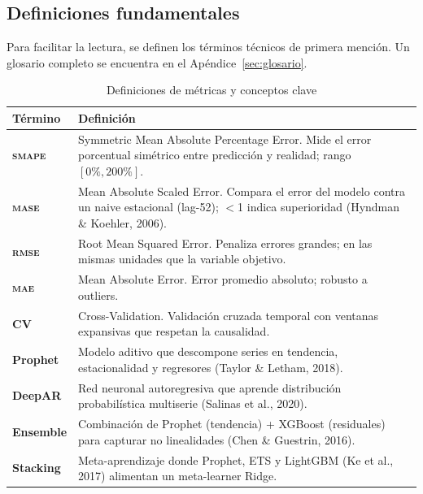 \documentclass[12pt, letterpaper]{article}
\newcommand{\smape}{\textnormal{\textsc{smape}}}
\newcommand{\mase}{\textnormal{\textsc{mase}}}
\newcommand{\rmse}{\textnormal{\textsc{rmse}}}
\newcommand{\mae}{\textnormal{\textsc{mae}}}
\begin{document}
\newpage

\subsection{Definiciones fundamentales}

Para facilitar la lectura, se definen los términos técnicos de primera mención. Un glosario completo se encuentra en el Apéndice~\ref{sec:glosario}.

\begin{table}[H]
\centering
\caption{Definiciones de métricas y conceptos clave}
\label{tab:definiciones}
\small
\begin{tabularx}{\textwidth}{>{\bfseries}l X}
\toprule
\textbf{Término} & \textbf{Definición} \\
\midrule
\smape{} & Symmetric Mean Absolute Percentage Error. Mide el error porcentual simétrico entre predicción y realidad; rango $[0\%, 200\%]$. \\
\mase{} & Mean Absolute Scaled Error. Compara el error del modelo contra un naive estacional (lag-52); $<$1 indica superioridad (Hyndman \& Koehler, 2006). \\
\rmse{} & Root Mean Squared Error. Penaliza errores grandes; en las mismas unidades que la variable objetivo. \\
\mae{} & Mean Absolute Error. Error promedio absoluto; robusto a outliers. \\
CV & Cross-Validation. Validación cruzada temporal con ventanas expansivas que respetan la causalidad. \\
Prophet & Modelo aditivo que descompone series en tendencia, estacionalidad y regresores (Taylor \& Letham, 2018). \\
DeepAR & Red neuronal autoregresiva que aprende distribución probabilística multiserie (Salinas et al., 2020). \\
Ensemble & Combinación de Prophet (tendencia) + XGBoost (residuales) para capturar no linealidades (Chen \& Guestrin, 2016). \\
Stacking & Meta-aprendizaje donde Prophet, ETS y LightGBM (Ke et al., 2017) alimentan un meta-learner Ridge. \\
\bottomrule
\end{tabularx}
\end{table}

\newpage
\end{document}
